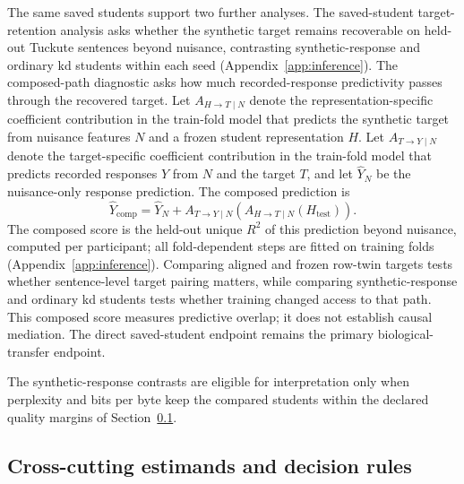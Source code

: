 The same saved students support two further analyses.
The saved-student target-retention analysis asks whether the synthetic target remains recoverable on held-out Tuckute sentences beyond nuisance, contrasting synthetic-response and ordinary \ac{kd} students within each seed (Appendix~\ref{app:inference}).
The composed-path diagnostic asks how much recorded-response predictivity passes through the recovered target.
Let \(A_{H\rightarrow T\mid N}\) denote the representation-specific coefficient contribution in the train-fold model that predicts the synthetic target from nuisance features \(N\) and a frozen student representation \(H\).
Let \(A_{T\rightarrow Y\mid N}\) denote the target-specific coefficient contribution in the train-fold model that predicts recorded responses \(Y\) from \(N\) and the target \(T\), and let \(\widehat{Y}_{N}\) be the nuisance-only response prediction.
The composed prediction is
\begin{equation}
\widehat{Y}_{\mathrm{comp}}
=
\widehat{Y}_{N}
+
A_{T\rightarrow Y\mid N}
\!\left(
A_{H\rightarrow T\mid N}(H_{\mathrm{test}})
\right).
\label{eq:synthetic-composed-path}
\end{equation}
The composed score is the held-out unique \(R^2\) of this prediction beyond nuisance, computed per participant; all fold-dependent steps are fitted on training folds (Appendix~\ref{app:inference}).
Comparing aligned and frozen row-twin targets tests whether sentence-level target pairing matters, while comparing synthetic-response and ordinary \ac{kd} students tests whether training changed access to that path.
This composed score measures predictive overlap; it does not establish causal mediation.
The direct saved-student endpoint remains the primary biological-transfer endpoint.

The synthetic-response contrasts are eligible for interpretation only when perplexity and bits per byte keep the compared students within the declared quality margins of Section~\ref{sec:estimands}.

\subsection{Cross-cutting estimands and decision rules}
\label{sec:estimands}


